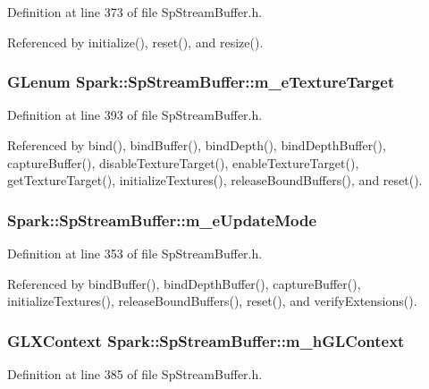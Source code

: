 Definition at line 373 of file Sp\-Stream\-Buffer.h.

Referenced by initialize(), reset(), and resize().
\subsubsection{\setlength{\rightskip}{0pt plus 5cm}GLenum {\bf Spark::Sp\-Stream\-Buffer::m\_\-e\-Texture\-Target}\hspace{0.3cm}{\tt  [protected]}}\label{classSpark_1_1SpStreamBuffer_p26}


Definition at line 393 of file Sp\-Stream\-Buffer.h.

Referenced by bind(), bind\-Buffer(), bind\-Depth(), bind\-Depth\-Buffer(), capture\-Buffer(), disable\-Texture\-Target(), enable\-Texture\-Target(), get\-Texture\-Target(), initialize\-Textures(), release\-Bound\-Buffers(), and reset().
\subsubsection{ {\bf Spark::Sp\-Stream\-Buffer::m\_\-e\-Update\-Mode}\hspace{0.3cm}{\tt  [protected]}}\label{classSpark_1_1SpStreamBuffer_p5}


Definition at line 353 of file Sp\-Stream\-Buffer.h.

Referenced by bind\-Buffer(), bind\-Depth\-Buffer(), capture\-Buffer(), initialize\-Textures(), release\-Bound\-Buffers(), reset(), and verify\-Extensions().
\subsubsection{\setlength{\rightskip}{0pt plus 5cm}GLXContext {\bf Spark::Sp\-Stream\-Buffer::m\_\-h\-GLContext}\hspace{0.3cm}{\tt  [protected]}}\label{classSpark_1_1SpStreamBuffer_p22}


Definition at line 385 of file Sp\-Stream\-Buffer.h.

